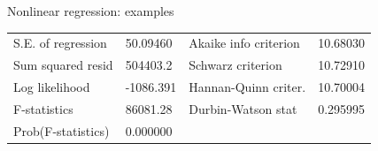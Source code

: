\documentclass{beamer}
\begin{document}
\begin{frame}{Nonlinear regression: examples}
\begin{table}[]
\begin{tabular}{@{}lllll@{}}
S.E. of regression                                                    & 50.09460                                                      & \multicolumn{2}{l}{Akaike info criterion}                                                                                             & 10.68030                                                   \\
Sum squared resid                                                     & 504403.2                                                      & \multicolumn{2}{l}{Schwarz criterion}                                                                                                 & 10.72910                                                   \\
Log likelihood                                                        & -1086.391                                                     & \multicolumn{2}{l}{Hannan-Quinn criter.}                                                                                              & 10.70004                                                   \\
F-statistics                                                          & 86081.28                                                      & \multicolumn{2}{l}{Durbin-Watson stat}                                                                                                & 0.295995                                                   \\
Prob(F-statistics)                                                    & 0.000000                                                      & \multicolumn{2}{l}{}                                                                                                                  &                                                            \\ \bottomrule
\end{tabular}
\end{table}
\end{frame}
\end{document}
